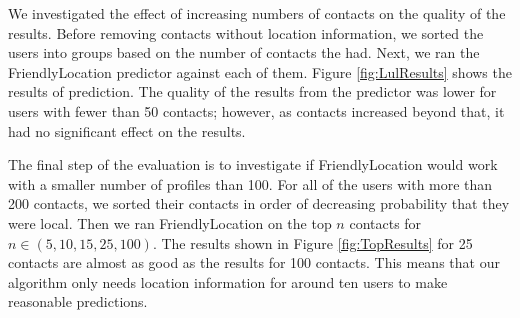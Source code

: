 We investigated the effect of increasing numbers of contacts on the quality of the results.
Before removing contacts without location information, we sorted the users into
groups based on the number of contacts the had.
Next, we ran the FriendlyLocation predictor against each of them.
Figure \ref{fig:LulResults} shows the results of prediction.
The quality of the results from the predictor was lower for users with fewer
than 50 contacts; however, as contacts increased beyond that, it had no
significant effect on the results.


The final step of the evaluation is to investigate if FriendlyLocation would work with a smaller number of profiles than 100.
For all of the users with more than 200 contacts, we sorted their contacts in
order of decreasing probability that they were local.
Then we ran FriendlyLocation on the top \(n\) contacts for \(n\in (5,10,15,25,100)\).
The results shown in Figure \ref{fig:TopResults} for 25 contacts are almost as
good as the results for 100 contacts. This means that our algorithm only needs
location information for around ten users to make reasonable predictions.


